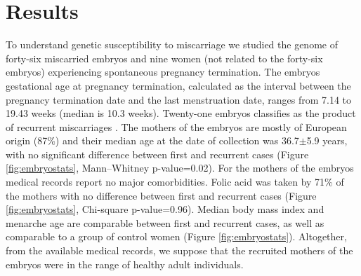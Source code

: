 \documentclass[fleqn,10pt]{wlscirep}
\begin{document}
 


\section*{Results}

To understand genetic susceptibility to miscarriage we studied the genome of forty-six miscarried embryos and nine women (not related to the forty-six embryos) experiencing spontaneous pregnancy termination. The embryos gestational age at pregnancy termination, calculated as the interval between the pregnancy termination date and the last menstruation date, ranges from 7.14 to 19.43 weeks (median is 10.3 weeks). Twenty-one embryos classifies as the product of recurrent miscarriages \cite{eshre2018eshre}. The mothers of the embryos are mostly of European origin (87\%) and their median age at the date of collection was 36.7$\pm$5.9 years, with no significant difference between first and recurrent cases (Figure \ref{fig:embryostats}, Mann–Whitney p-value=0.02). For the mothers of the embryos medical records report no major comorbidities. Folic acid was taken by 71\% of the mothers with no difference between first and recurrent cases (Figure \ref{fig:embryostats}, Chi-square p-value=0.96). Median body mass index and menarche age are comparable between first and recurrent cases, as well as comparable to a group of control women (Figure \ref{fig:embryostats}). Altogether, from the available medical records, we suppose that the recruited mothers of the embryos were in the range of healthy adult individuals.
\end{document}
